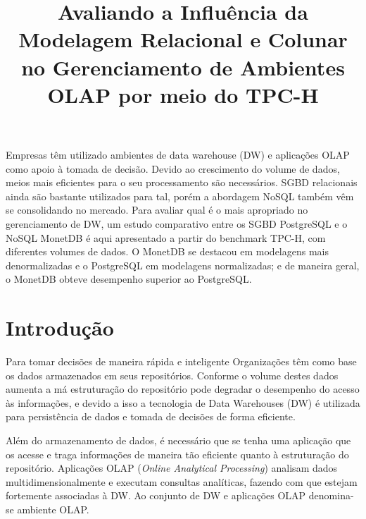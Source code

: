 \documentclass[12pt]{article}
\begin{document}
 

\title{Avaliando a Influência da Modelagem Relacional e Colunar no Gerenciamento de Ambientes OLAP por meio do TPC-H}
\author{}
\address{}

\maketitle

\begin{abstract}



\end{abstract}
     
\begin{resumo}
Empresas têm utilizado ambientes de data warehouse (DW) 
e aplicações OLAP como apoio à tomada de decisão. 
Devido ao crescimento do volume de dados, meios mais eficientes para o seu processamento 
são necessários. SGBD relacionais ainda são bastante utilizados para tal, 
porém a abordagem NoSQL também vêm se consolidando no mercado. 
Para avaliar qual é o mais apropriado no gerenciamento de DW, um estudo comparativo entre 
os SGBD PostgreSQL e o NoSQL MonetDB é aqui apresentado a 
partir do benchmark TPC-H, com diferentes volumes de dados. O MonetDB se 
destacou em modelagens mais denormalizadas e o PostgreSQL em modelagens normalizadas; e de maneira geral, 
o MonetDB obteve desempenho superior ao PostgreSQL.    
\end{resumo}

\section{Introdução}
Para tomar decisões de maneira rápida e inteligente Organizações têm como base os dados armazenados em seus repositórios.
Conforme o volume destes dados aumenta a má estruturação do repositório pode degradar o desempenho do acesso às informações,
e devido a isso a tecnologia de Data Warehouses (DW) é utilizada para persistência de dados e tomada de decisões de forma eficiente.

Além do armazenamento de dados, é necessário que se tenha uma aplicação que os acesse e traga informações
de maneira tão eficiente quanto à estruturação do repositório. Aplicações OLAP (\textit{Online Analytical Processing}) 
analisam dados multidimensionalmente 
e executam consultas analíticas, fazendo com que estejam fortemente associadas à DW.
Ao conjunto de DW e aplicações OLAP denomina-se ambiente OLAP.
\end{document}
